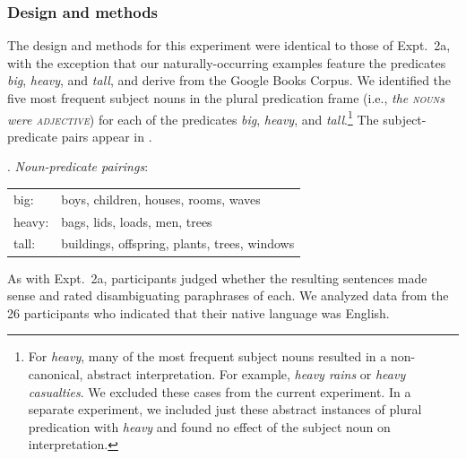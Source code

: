 \documentclass[linguex]{sp}
\begin{document}
\subsubsection{Design and methods}

The design and methods for this experiment were identical to those of Expt.~2a, with the exception that our naturally-occurring examples feature the predicates \emph{big}, \emph{heavy}, and \emph{tall}, and derive from the Google Books Corpus. We identified the five most frequent subject nouns in the plural predication frame (i.e., \emph{the \textsc{noun}s were \textsc{adjective}}) for each of the predicates \emph{big}, \emph{heavy}, and \emph{tall}.\footnote{For \emph{heavy}, many of the most frequent subject nouns resulted in a non-canonical, abstract interpretation. For example, \emph{heavy rains} or \emph{heavy casualties}. We excluded these cases from the current experiment. In a separate experiment, we included just these abstract instances of plural predication with \emph{heavy} and found no effect of the subject noun on interpretation.} The subject-predicate pairs appear in \Next.

\ex. \emph{Noun-predicate pairings}:\\[2pt]
\begin{tabular}{ll}
big:& boys, children, houses, rooms, waves\\
heavy:& bags, lids, loads, men, trees\\
tall:& buildings, offspring, plants, trees, windows
\end{tabular}	

As with Expt.~2a, participants judged whether the resulting sentences made sense and rated disambiguating paraphrases of each. We analyzed data from the 26 participants who indicated that their native language was English.
\end{document}
